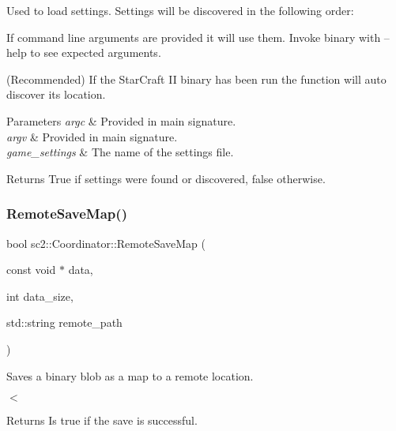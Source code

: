 Used to load settings. Settings will be discovered in the following order\+:
\begin{DoxyEnumerate}
\item If command line arguments are provided it will use them. Invoke binary with --help to see expected arguments.
\item (Recommended) If the Star\+Craft II binary has been run the function will auto discover its location. 
\begin{DoxyParams}{Parameters}
{\em argc} & Provided in main signature. \\
\hline
{\em argv} & Provided in main signature. \\
\hline
{\em game\+\_\+settings} & The name of the settings file. \\
\hline
\end{DoxyParams}
\begin{DoxyReturn}{Returns}
True if settings were found or discovered, false otherwise. 
\end{DoxyReturn}

\end{DoxyEnumerate}\mbox{\label{classsc2_1_1_coordinator_abddb83c4a267e3592932da7d198a97d5}} 
\subsubsection{\texorpdfstring{Remote\+Save\+Map()}{RemoteSaveMap()}}
{\footnotesize\ttfamily bool sc2\+::\+Coordinator\+::\+Remote\+Save\+Map (\begin{DoxyParamCaption}\item[{const void $\ast$}]{data,  }\item[{int}]{data\+\_\+size,  }\item[{std\+::string}]{remote\+\_\+path }\end{DoxyParamCaption})}



Saves a binary blob as a map to a remote location. 

$<$ \begin{DoxyReturn}{Returns}
Is true if the save is successful. 
\end{DoxyReturn}
\mbox{\label{classsc2_1_1_coordinator_ac4071b2072ce3120b135c37c7e7587d1}} 
